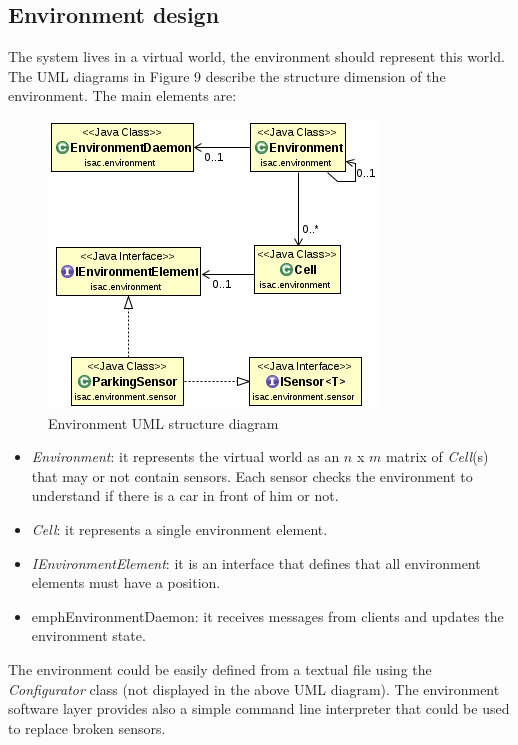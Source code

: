 \documentclass[11pt]{article}
\begin{document}
\subsection{Environment design}
The system lives in a virtual world, the environment should represent this world. The UML diagrams in Figure 9 describe the structure dimension of the environment. The main elements are:
\begin{figure}
  \centering
	\includegraphics[scale=0.65]{environmentUML}
  \caption{Environment UML structure diagram}
\end{figure}
\begin{itemize}
\item \emph{Environment}: it represents the virtual world as an $n$ x $m$ matrix of \emph{Cell}(s) that may or not contain sensors. Each sensor checks the environment to understand if there is a car in front of him or not.
\item \emph{Cell}: it represents a single environment element. 
\item \emph{IEnvironmentElement}: it is an interface that defines that all environment elements must have a position.
\item emph{EnvironmentDaemon}: it receives messages from clients and updates the environment state.
\end{itemize}
The environment could be easily defined from a textual file using the \emph{Configurator} class (not displayed in the above UML diagram). The environment software layer provides also a simple command line interpreter that could be used to replace broken sensors.
\end{document}
